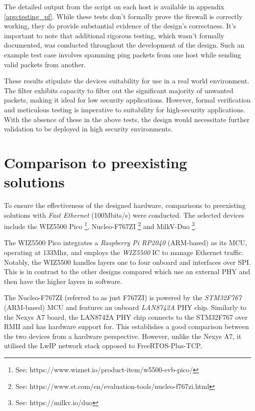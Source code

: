 The detailed output from the script on each host is available in appendix \ref{app:testing_pf}. While these tests don't formally prove the firewall is correctly working, they do provide substantial evidence of the design's correctness. It's important to note that additional rigorous testing, which wasn't formally documented, was conducted throughout the development of the design. Such an example test case involves spamming ping packets from one host while sending valid packets from another. 

These results stipulate the devices suitability for use in a real world environment. The filter exhibits capacity to filter out the significant majority of unwanted packets, making it ideal for low security applications. However, formal verification and meticulous testing is imperative to suitability for high-security applications. With the absence of these in the above tests, the design would necessitate further validation to be deployed in high security environments. 















\section{Comparison to preexisting solutions}

To ensure the effectiveness of the designed hardware, comparisons to preexisting solutions with \textit{Fast Ethernet} (100Mbits/s) were conducted. The selected devices include the WIZ5500 Pico \footnote[1]{See: https://www.wiznet.io/product-item/w5500-evb-pico/}, Nucleo-F767ZI \footnote[2]{See: https://www.st.com/en/evaluation-tools/nucleo-f767zi.html} and MilkV-Duo \footnote[3]{See: https://milkv.io/duo}.

The WIZ5500 Pico integrates a \textit{Raspberry Pi RP2040} (ARM-based) as its MCU, operating at 133Mhz, and employs the \textit{WIZ5500} IC to manage Ethernet traffic. Notably, the WIZ5500 handles layers one to four onboard and interfaces over SPI. This is in contrast to the other designs compared which use an external PHY and then have the higher layers in software. 

The Nucleo-F767ZI (referred to as just F767ZI) is powered by the \textit{STM32F767} (ARM-based) MCU and features an onboard \textit{LAN8742A} PHY chip. Similarly to the Nexys A7 board, the LAN8742A PHY chip connects to the STM32F767 over RMII and has hardware support for. This establishes a good comparison between the two devices from a hardware perspective. However, unlike the Nexys A7, it utilised the LwIP network stack opposed to FreeRTOS-Plus-TCP. 


